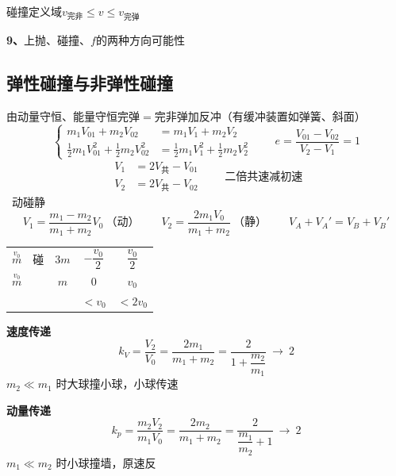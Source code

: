 碰撞定义域\quad $v_{\text{完非}}\le v\le v_{\text{完弹}}$

\textbf{9、}上抛、碰撞、$f$的两种方向可能性

\subsection{弹性碰撞与非弹性碰撞}
\quad 由动量守恒、能量守恒\quad 完弹$=$完非弹加反冲（有缓冲装置如弹簧、斜面）
\[
\left\{\begin{aligned}
m_1V_{01}+m_2V_{02}&=m_1V_1+m_2V_2\\
\tfrac12m_1V_{01}^2+\tfrac12m_2V_{02}^2&=\tfrac12m_1V_1^2+\tfrac12m_2V_2^2
\end{aligned}\right.
\qquad e=\frac{V_{01}-V_{02}}{V_2-V_1}=1 %
\]
\[
\begin{aligned}V_1&=2V_{\text{共}}-V_{01}\\V_2&=2V_{\text{共}}-V_{02}\end{aligned}
\qquad\text{二倍共速减初速}
\]
\ 动碰静
\[
V_1=\frac{m_1-m_2}{m_1+m_2}V_0\ \text{（动）}\qquad V_2=\frac{2m_1V_0}{m_1+m_2}\ \text{（静）}\qquad V_A+V_A'=V_B+V_B'
\]

\begin{center}
\begin{tabular}{ccccc}
$\overset{v_0}{m}$ & 碰 & $3m$ & $-\dfrac{v_0}{2}$ & $\dfrac{v_0}{2}$\\[6pt]
$\overset{v_0}{m}$ & & $m$ & $0$ & $v_0$\\[6pt]
 & & & $<v_0$ & $<2v_0$
\end{tabular}
\end{center}

\textbf{速度传递}
\[
k_V=\frac{V_2}{V_0}=\frac{2m_1}{m_1+m_2}=\frac{2}{1+\dfrac{m_2}{m_1}}\ \to\ 2
\]
$m_2\ll m_1$ 时大球撞小球，小球传速\, %

\textbf{动量传递}
\[
k_p=\frac{m_2V_2}{m_1V_0}=\frac{2m_2}{m_1+m_2}=\frac{2}{\dfrac{m_1}{m_2}+1}\ \to\ 2
\]
$m_1\ll m_2$ 时小球撞墙，原速\red{$\times$}反 %

